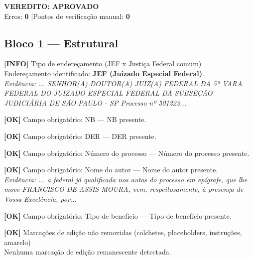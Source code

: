 \documentclass[12pt,a4paper]{article}
\newcommand{\statusOK}[1]{\textcolor{corOK}{\textbf{[OK]}} #1}
\newcommand{\statusINFO}[1]{\textcolor{corINFO}{\textbf{[INFO]}} #1}
\begin{document}
\vspace{0.5em}

\noindent\colorbox{corFundoAprovado}{%
  \begin{minipage}{\dimexpr\linewidth-2\fboxsep}
    \centering
    \vspace{0.3em}
    {\large \textcolor{corOK}{\textbf{VEREDITO: APROVADO}}}\\
    Erros: \textbf{0} \quad|\quad Pontos de verificação manual: \textbf{0}
    \vspace{0.3em}
  \end{minipage}%
}

\vspace{1em}


\subsection{Bloco 1 --- Estrutural}

\statusINFO{Tipo de endereçamento (JEF x Justiça Federal comum)}\\
Endereçamento identificado: \textbf{JEF (Juizado Especial Federal)}.\\
\textit{Evidência: ... SENHOR(A) DOUTOR(A) JUIZ(A) FEDERAL DA 5ª VARA FEDERAL DO JUIZADO ESPECIAL FEDERAL DA SUBSEÇÃO JUDICIÁRIA DE SÃO PAULO - SP Processo nº 501223...}

\medskip
\statusOK{Campo obrigatório: NB} --- NB presente.

\medskip
\statusOK{Campo obrigatório: DER} --- DER presente.

\medskip
\statusOK{Campo obrigatório: Número do processo} --- Número do processo presente.

\medskip
\statusOK{Campo obrigatório: Nome do autor} --- Nome do autor presente.\\
\textit{Evidência: ... a federal já qualificada nos autos do processo em epígrafe, que lhe move FRANCISCO DE ASSIS MOURA, vem, respeitosamente, à presença de Vossa Excelência, por...}

\medskip
\statusOK{Campo obrigatório: Tipo de benefício} --- Tipo de benefício presente.

\medskip
\statusOK{Marcações de edição não removidas (colchetes, placeholders, instruções, amarelo)}\\
Nenhuma marcação de edição remanescente detectada.
\end{document}
